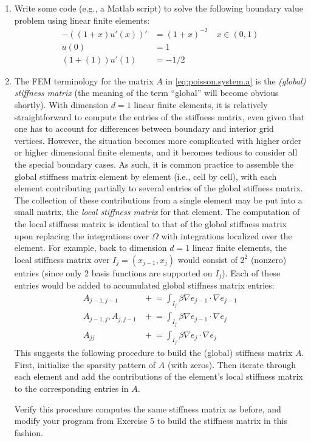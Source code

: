 \begin{enumerate}
\item Write some code (e.g., a Matlab script) to solve the following boundary value problem using linear finite elements:
\begin{align*}
-\left( \left( 1 + x \right) u'(x) \right)' & = \left( 1 + x \right)^{-2} \quad x \in (0, 1) \\
u(0) & = 1 \\
\left( 1 + (1) \right) u'(1) & = -1/2
\end{align*}

\item The FEM terminology for the matrix $A$ in \eqref{eq:poisson.system.a} is the \emph{(global) stiffness matrix} (the meaning of the term ``global'' will become obvious shortly). With dimension $d = 1$ linear finite elements, it is relatively straightforward to compute the entries of the stiffness matrix, even given that one has to account for differences between boundary and interior grid vertices. However, the situation becomes more complicated with higher order or higher dimensional finite elements, and it becomes tedious to consider all the special boundary cases. As such, it is common practice to assemble the global stiffness matrix element by element (i.e., cell by cell), with each element contributing partially to several entries of the global stiffness matrix. The collection of these contributions from a single element may be put into a small matrix, the \emph{local stiffness matrix} for that element. The computation of the local stiffness matrix is identical to that of the global stiffness matrix upon replacing the integrations over $\Omega$ with integrations localized over the element. For example, back to dimension $d = 1$ linear finite elements, the local stiffness matrix over $I_j = \left( x_{j-1}, x_j \right)$ would consist of $2^2$ (nonzero) entries (since only $2$ basis functions are supported on $I_j$). Each of these entries would be added to accumulated global stiffness matrix entries:
\begin{align*}
A_{j-1,j-1}          & {} +\!\!= \int_{I_j} \beta \nabla e_{j-1} \cdot \nabla e_{j-1} \\
A_{j-1,j}, A_{j,j-1} & {} +\!\!= \int_{I_j} \beta \nabla e_{j-1} \cdot \nabla e_j \\
A_{jj}               & {} +\!\!= \int_{I_j} \beta \nabla e_j \cdot \nabla e_j
\end{align*}
This suggests the following procedure to build the (global) stiffness matrix $A$. First, initialize the sparsity pattern of $A$ (with zeros). Then iterate through each element and add the contributions of the element's local stiffness matrix to the corresponding entries in $A$.

Verify this procedure computes the same stiffness matrix as before, and modify your program from Exercise 5 to build the stiffness matrix in this fashion.

\end{enumerate}

